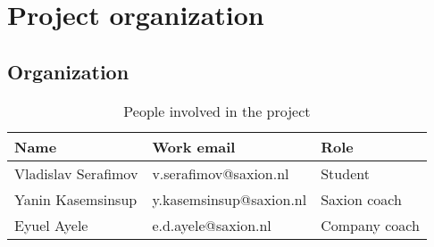 \documentclass{report}
\begin{document}
	
	
	
	
	\chapter{Project organization}
	
	\section{Organization}
	
	\begin{table}[h]
		\centering
		\begin{tabular}{|l|l|l|}
			\hline
			Name                & Work email              & Role          \\ \hline
			Vladislav Serafimov & v.serafimov@saxion.nl   & Student       \\ \hline
			Yanin Kasemsinsup   & y.kasemsinsup@saxion.nl & Saxion coach  \\ \hline
			Eyuel Ayele         & e.d.ayele@saxion.nl     & Company coach \\ \hline
		\end{tabular}
		\caption{People involved in the project}
		\label{involved}
	\end{table}
	
\end{document}
